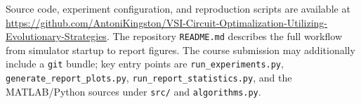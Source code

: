 \documentclass[pdflatex,sn-mathphys-num]{sn-jnl}
\begin{document}
Source code, experiment configuration, and reproduction scripts are available at
\url{https://github.com/AntoniKingston/VSI-Circuit-Optimalization-Utilizing-Evolutionary-Strategies}.
The repository \texttt{README.md} describes the full workflow from simulator startup to report figures.
The course submission may additionally include a \texttt{git} bundle; key entry points are \texttt{run\_experiments.py}, \texttt{generate\_report\_plots.py}, \texttt{run\_report\_statistics.py}, and the MATLAB/Python sources under \texttt{src/} and \texttt{algorithms.py}.



\end{document}
